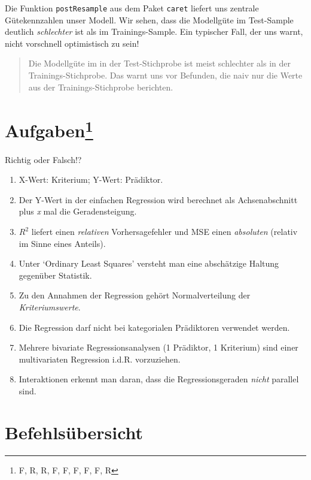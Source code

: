 \documentclass[12pt,ngerman,]{book}
\let\rmarkdownfootnote\footnote%
\def\footnote{\protect\rmarkdownfootnote}
\theoremstyle{definition}
\theoremstyle{definition}
\theoremstyle{remark}
\let\BeginKnitrBlock\begin \let\EndKnitrBlock\end
\begin{document}
Die Funktion \texttt{postResample} aus dem Paket \texttt{caret} liefert
uns zentrale Gütekennzahlen unser Modell. Wir sehen, dass die Modellgüte
im Test-Sample deutlich \emph{schlechter} ist als im Trainings-Sample.
Ein typischer Fall, der uns warnt, nicht vorschnell optimistisch zu
sein!

\begin{quote}
Die Modellgüte im in der Test-Stichprobe ist meist schlechter als in der
Trainings-Stichprobe. Das warnt uns vor Befunden, die naiv nur die Werte
aus der Trainings-Stichprobe berichten.
\end{quote}

\section[Aufgaben]{\texorpdfstring{Aufgaben\footnote{F, R, R, F, F, F,
  F, F, R}}{Aufgaben}}\label{aufgaben-13}

\BeginKnitrBlock{rmdexercises}
Richtig oder Falsch!?

\begin{enumerate}
\def\labelenumi{\arabic{enumi}.}
\item
  X-Wert: Kriterium; Y-Wert: Prädiktor.
\item
  Der Y-Wert in der einfachen Regression wird berechnet als
  Achsenabschnitt plus \emph{x} mal die Geradensteigung.
\item
  \(R^2\) liefert einen \emph{relativen} Vorhersagefehler und MSE einen
  \emph{absoluten} (relativ im Sinne eines Anteils).
\item
  Unter `Ordinary Least Squares' versteht man eine abschätzige Haltung
  gegenüber Statistik.
\item
  Zu den Annahmen der Regression gehört Normalverteilung der
  \emph{Kriteriumswerte}.
\item
  Die Regression darf nicht bei kategorialen Prädiktoren verwendet
  werden.
\item
  Mehrere bivariate Regressionsanalysen (1 Prädiktor, 1 Kriterium) sind
  einer multivariaten Regression i.d.R. vorzuziehen.
\item
  Interaktionen erkennt man daran, dass die Regressionsgeraden
  \emph{nicht} parallel sind.
\end{enumerate}
\EndKnitrBlock{rmdexercises}

\section{Befehlsübersicht}\label{befehlsubersicht-6}
\end{document}
